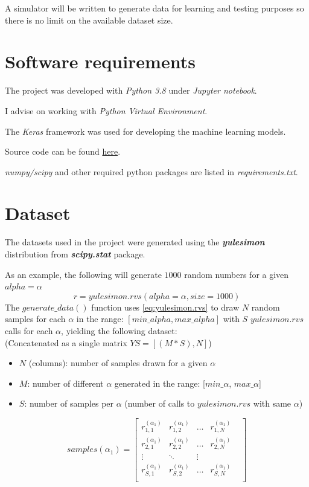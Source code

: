 \documentclass[a4paper, 12pt]{report}
\begin{document}
\par A simulator will be written to generate data for learning and testing purposes so there is no limit on the available dataset size.

\section{Software requirements}
The project was developed with \textit{Python 3.8} under \textit{Jupyter notebook}.

I advise on working with \textit{Python Virtual Environment}.

The \textit{Keras} framework was used for developing the machine learning models.

Source code can be found \href{https://github.com/yossi-cohen/preferential-attachment}{here}.

\textit{numpy/scipy} and other required python packages are listed in \textit{requirements.txt}.

\section{Dataset}
\label{dataset}

\par The datasets used in the project were generated using the \textbf{\textit{yulesimon}} distribution from \textbf{\textit{scipy.stat}} package.

\par As an example, the following will generate $1000$ random numbers for a given $alpha=\alpha$
\begin{equation}
\label{eq:yulesimon.rvs}
r = yulesimon.rvs(alpha=\alpha, size=1000)
\end{equation}
The $generate\_data()$ function uses \ref{eq:yulesimon.rvs} to draw $N$ random samples for each $\alpha$ in the range: $[min\_alpha, max\_alpha]$ with $S$ $yulesimon.rvs$ calls for each $\alpha$, yielding the following dataset:\\
(Concatenated as a single matrix $YS = [(M * S), N]$)
\begin{itemize}
\small
  \item $N$ (columns): number of samples drawn for a given $\alpha$
  \item $M$: number of different $\alpha$ generated in the range: [$min\_\alpha$, $max\_\alpha$]
  \item $S$: number of samples per $\alpha$ (number of calls to $yulesimon.rvs$ with same $\alpha$)
\end{itemize}
\[
samples(\alpha_1) = \begin{bmatrix} 
    r^{(\alpha_1)}_{1,1} & r^{(\alpha_1)}_{1,2} & \dots & r^{(\alpha_1)}_{1,N} & \\
    r^{(\alpha_1)}_{2,1} & r^{(\alpha_1)}_{2,2} & \dots & r^{(\alpha_1)}_{2,N} & \\
    \vdots & \ddots & \vdots & \\
    r^{(\alpha_1)}_{S,1} & r^{(\alpha_1)}_{S,2} & \dots & r^{(\alpha_1)}_{S,N} & \\
\end{bmatrix}
\]
\end{document}
